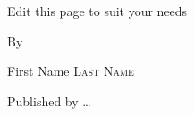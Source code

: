 \begin{titlepage}
\begingroup
\begin{center}
\null%
\noindent


{\makeatletter
\huge\@title%
\makeatother}

\bigskip

{\Large Edit this page to suit your needs}

\bigskip
\bigskip

By

\makeatletter
{\large First Name {\scshape Last Name}}
\makeatother

\vfill

Published by \ldots

\end{center}
\end{titlepage}
